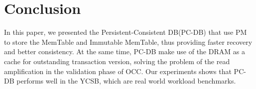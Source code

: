\section{Conclusion}
In this paper, we presented the Persistent-Consistent DB(PC-DB) that use PM to store the MemTable and Immutable MemTable, thus providing faster recovery and better consistency. At the same time, PC-DB make use of the DRAM as a cache for outstanding transaction version, solving the problem of the read amplification in the validation phase of OCC. Our experiments shows that PC-DB performs well in the  YCSB, which are real world workload benchmarks.